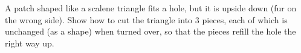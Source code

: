 A patch shaped like a scalene triangle fits a hole, but it is upside down (fur on the wrong side). Show how to cut the triangle into $3$ pieces, each of which is unchanged (as a shape) when turned over, so that the pieces refill the hole the right way up.

